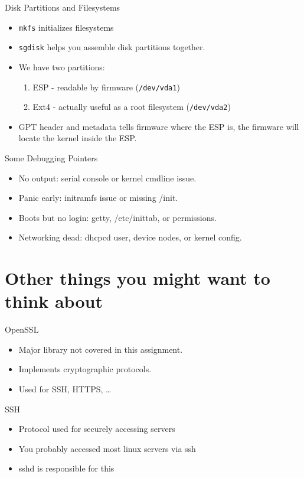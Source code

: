\documentclass{../lecture}
\begin{document}
\begin{frame}{Disk Partitions and Filesystems}
  \begin{itemize}
    \item \texttt{mkfs} initializes filesystems
    \item \texttt{sgdisk} helps you assemble disk partitions together.
    \item We have two partitions:
      \begin{enumerate}
        \item ESP - readable by firmware (\texttt{/dev/vda1})
        \item Ext4 - actually useful as a root filesystem (\texttt{/dev/vda2})
      \end{enumerate}
    \item GPT header and metadata tells firmware where the ESP is, the firmware
      will locate the kernel inside the ESP.
  \end{itemize}
\end{frame}

\begin{frame}{Some Debugging Pointers}
  \begin{itemize}
    \item No output: serial console or kernel cmdline issue.
    \item Panic early: initramfs issue or missing /init.
    \item Boots but no login: getty, /etc/inittab, or permissions.
    \item Networking dead: dhcpcd user, device nodes, or kernel config.
  \end{itemize}
\end{frame}

\section{Other things you might want to think about}

\begin{frame}{OpenSSL}
  \begin{itemize}
    \item Major library not covered in this assignment.
    \item Implements cryptographic protocols.
    \item Used for SSH, HTTPS, \dots
  \end{itemize}
\end{frame}

\begin{frame}{SSH}
  \begin{itemize}
    \item Protocol used for securely accessing servers
    \item You probably accessed most linux servers via ssh
    \item sshd is responsible for this
  \end{itemize}
\end{frame}
\end{document}
